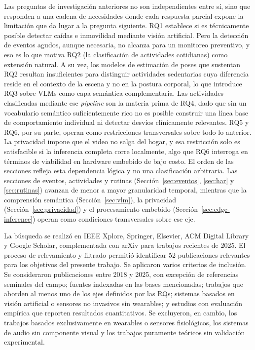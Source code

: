 Las preguntas de investigación anteriores no son independientes entre sí, sino que responden a una cadena de necesidades donde cada respuesta parcial expone la limitación que da lugar a la pregunta siguiente.
RQ1 establece si es técnicamente posible detectar caídas e inmovilidad mediante visión artificial.
Pero la detección de eventos agudos, aunque necesaria, no alcanza para un monitoreo preventivo, y eso es lo que motiva RQ2 (la clasificación de actividades cotidianas) como extensión natural.
A su vez, los modelos de estimación de poses que sustentan RQ2 resultan insuficientes para distinguir actividades sedentarias cuya diferencia reside en el contexto de la escena y no en la postura corporal, lo que introduce RQ3 sobre VLMs como capa semántica complementaria.
Las actividades clasificadas mediante ese \textit{pipeline} son la materia prima de RQ4, dado que sin un vocabulario semántico suficientemente rico no es posible construir una línea base de comportamiento individual ni detectar desvíos clínicamente relevantes.
RQ5 y RQ6, por su parte, operan como restricciones transversales sobre todo lo anterior.
La privacidad impone que el video no salga del hogar, y esa restricción solo es satisfacible si la inferencia completa corre localmente, algo que RQ6 interroga en términos de viabilidad en hardware embebido de bajo costo.
El orden de las secciones refleja esta dependencia lógica y no una clasificación arbitraria.
Las secciones de eventos, actividades y rutinas (Sección~\ref{sec:eventos}, \ref{sec:har} y \ref{sec:rutinas}) avanzan de menor a mayor granularidad temporal, mientras que la comprensión semántica (Sección~\ref{sec:vlm}), la privacidad (Sección~\ref{sec:privacidad}) y el procesamiento embebido (Sección~\ref{sec:edge-inference}) operan como condiciones transversales sobre ese eje.

La búsqueda se realizó en IEEE Xplore, Springer, Elsevier, ACM Digital Library y Google Scholar, complementada con arXiv para trabajos recientes de 2025.
El proceso de relevamiento y filtrado permitió identificar 52 publicaciones relevantes para los objetivos del presente trabajo.
Se aplicaron varios criterios de inclusión.
Se consideraron publicaciones entre 2018 y 2025, con excepción de referencias seminales del campo; fuentes indexadas en las bases mencionadas; trabajos que aborden al menos uno de los ejes definidos por las RQs; sistemas basados en visión artificial o sensores no invasivos sin wearables; y estudios con evaluación empírica que reporten resultados cuantitativos.
Se excluyeron, en cambio, los trabajos basados exclusivamente en wearables o sensores fisiológicos, los sistemas de audio sin componente visual y los trabajos puramente teóricos sin validación experimental.

